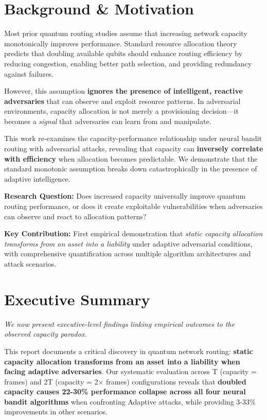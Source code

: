\documentclass[11pt,a4paper]{article}
\newcommand{\performance}[1]{\textcolor{performancecolor}{\textbf{#1}}}
\newcommand{\critical}[1]{\textcolor{criticalcolor}{\textbf{#1}}}
\begin{document}
\newpage
{\small\tableofcontents}
\newpage

\section{Background \& Motivation}

Most prior quantum routing studies assume that increasing network capacity monotonically improves performance. Standard resource allocation theory predicts that doubling available qubits should enhance routing efficiency by reducing congestion, enabling better path selection, and providing redundancy against failures.

However, this assumption \critical{ignores the presence of intelligent, reactive adversaries} that can observe and exploit resource patterns. In adversarial environments, capacity allocation is not merely a provisioning decision—it becomes a \textit{signal} that adversaries can learn from and manipulate.

This work re-examines the capacity-performance relationship under neural bandit routing with adversarial attacks, revealing that capacity can \critical{inversely correlate with efficiency} when allocation becomes predictable. We demonstrate that the standard monotonic assumption breaks down catastrophically in the presence of adaptive intelligence.

\textbf{Research Question:} Does increased capacity universally improve quantum routing performance, or does it create exploitable vulnerabilities when adversaries can observe and react to allocation patterns?

\textbf{Key Contribution:} First empirical demonstration that \textit{static capacity allocation transforms from an asset into a liability} under adaptive adversarial conditions, with comprehensive quantification across multiple algorithm architectures and attack scenarios.

\section{Executive Summary}

\textit{We now present executive-level findings linking empirical outcomes to the observed capacity paradox.}

This report documents a critical discovery in quantum network routing: \performance{static capacity allocation transforms from an asset into a liability when facing adaptive adversaries}. Our systematic evaluation across T (capacity = frames) and 2T (capacity = 2× frames) configurations reveals that \critical{doubled capacity causes 22-30\% performance collapse across all four neural bandit algorithms} when confronting Adaptive attacks, while providing 3-33\% improvements in other scenarios.
\end{document}
